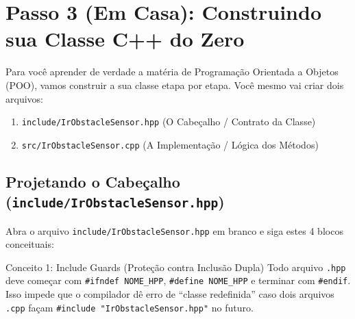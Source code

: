 \documentclass[11pt,a4paper]{article}
\begin{document}
\section{Passo 3 (Em Casa): Construindo sua Classe C++ do Zero}

Para você aprender de verdade a matéria de Programação Orientada a Objetos (POO), vamos construir a sua classe etapa por etapa. Você mesmo vai criar dois arquivos:
\begin{enumerate}
    \item \texttt{include/IrObstacleSensor.hpp} (O Cabeçalho / Contrato da Classe)
    \item \texttt{src/IrObstacleSensor.cpp} (A Implementação / Lógica dos Métodos)
\end{enumerate}

\subsection{Projetando o Cabeçalho (\texttt{include/IrObstacleSensor.hpp})}

Abra o arquivo \texttt{include/IrObstacleSensor.hpp} em branco e siga estes 4 blocos conceituais:

\begin{theorybox}{Conceito 1: Include Guards (Proteção contra Inclusão Dupla)}
Todo arquivo \texttt{.hpp} deve começar com \texttt{\#ifndef NOME\_HPP}, \texttt{\#define NOME\_HPP} e terminar com \texttt{\#endif}. Isso impede que o compilador dê erro de ``classe redefinida'' caso dois arquivos \texttt{.cpp} façam \texttt{\#include "IrObstacleSensor.hpp"} no futuro.
\end{theorybox}
\end{document}
